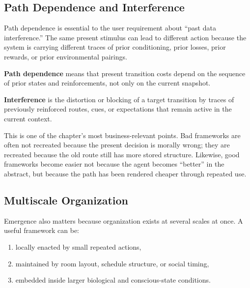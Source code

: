 \subsection{Path Dependence and Interference}

Path dependence is essential to the user requirement about ``past data
interference.'' The same present stimulus can lead to different action because
the system is carrying different traces of prior conditioning, prior losses,
prior rewards, or prior environmental pairings.

\begin{definition}
\textbf{Path dependence} means that present transition costs depend on the
sequence of prior states and reinforcements, not only on the current snapshot.
\end{definition}

\begin{definition}[Interference]
\textbf{Interference} is the distortion or blocking of a target transition by
traces of previously reinforced routes, cues, or expectations that remain
active in the current context.
\end{definition}

\begin{discussion}
This is one of the chapter's most business-relevant points. Bad frameworks are
often not recreated because the present decision is morally wrong; they are
recreated because the old route still has more stored structure. Likewise, good
frameworks become easier not because the agent becomes ``better'' in the
abstract, but because the path has been rendered cheaper through repeated use.
\end{discussion}

\subsection{Multiscale Organization}

Emergence also matters because organization exists at several scales at once.
A useful framework can be:
\begin{enumerate}[nosep]
  \item locally enacted by small repeated actions,
  \item maintained by room layout, schedule structure, or social timing,
  \item embedded inside larger biological and conscious-state conditions.
\end{enumerate}

